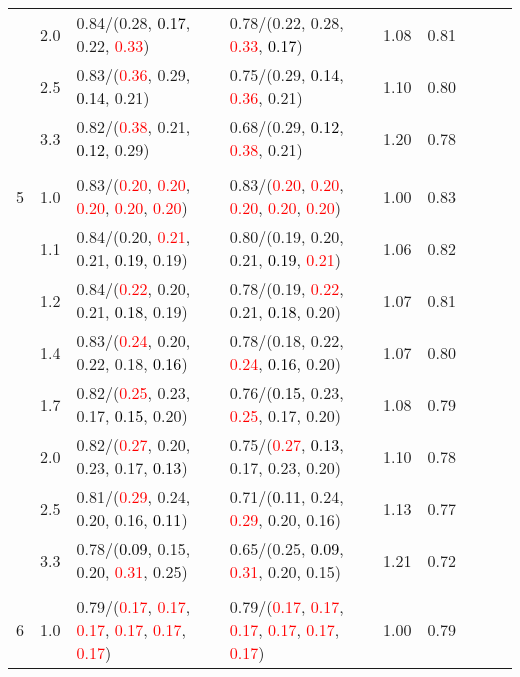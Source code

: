 \documentclass[10pt,a4paper]{report}
\begin{document}
\begin{table}[!htbp]
\begin{center}
{\begin{tabular}{ccllccccc}
			&2.0&0.84/(0.28, \textcolor{black}{0.17}, 0.22, \textcolor{red}{0.33})&0.78/(0.22, 0.28, \textcolor{red}{0.33}, \textcolor{black}{0.17})&1.08&0.81\\
			&2.5&0.83/(\textcolor{red}{0.36}, 0.29, \textcolor{black}{0.14}, 0.21)&0.75/(0.29, \textcolor{black}{0.14}, \textcolor{red}{0.36}, 0.21)&1.10&0.80\\
			&3.3&0.82/(\textcolor{red}{0.38}, 0.21, \textcolor{black}{0.12}, 0.29)&0.68/(0.29, \textcolor{black}{0.12}, \textcolor{red}{0.38}, 0.21)&1.20&0.78\\
			&&&&\\
			5			&1.0&0.83/(\textcolor{red}{0.20}, \textcolor{red}{0.20}, \textcolor{red}{0.20}, \textcolor{red}{0.20}, \textcolor{red}{0.20})&0.83/(\textcolor{red}{0.20}, \textcolor{red}{0.20}, \textcolor{red}{0.20}, \textcolor{red}{0.20}, \textcolor{red}{0.20})&1.00&0.83\\
			&1.1&0.84/(0.20, \textcolor{red}{0.21}, 0.21, \textcolor{black}{0.19}, 0.19)&0.80/(0.19, 0.20, 0.21, \textcolor{black}{0.19}, \textcolor{red}{0.21})&1.06&0.82\\
			&1.2&0.84/(\textcolor{red}{0.22}, 0.20, 0.21, \textcolor{black}{0.18}, 0.19)&0.78/(0.19, \textcolor{red}{0.22}, 0.21, \textcolor{black}{0.18}, 0.20)&1.07&0.81\\
			&1.4&0.83/(\textcolor{red}{0.24}, 0.20, 0.22, 0.18, \textcolor{black}{0.16})&0.78/(0.18, 0.22, \textcolor{red}{0.24}, \textcolor{black}{0.16}, 0.20)&1.07&0.80\\
			&1.7&0.82/(\textcolor{red}{0.25}, 0.23, 0.17, \textcolor{black}{0.15}, 0.20)&0.76/(\textcolor{black}{0.15}, 0.23, \textcolor{red}{0.25}, 0.17, 0.20)&1.08&0.79\\
			&2.0&0.82/(\textcolor{red}{0.27}, 0.20, 0.23, 0.17, \textcolor{black}{0.13})&0.75/(\textcolor{red}{0.27}, \textcolor{black}{0.13}, 0.17, 0.23, 0.20)&1.10&0.78\\
			&2.5&0.81/(\textcolor{red}{0.29}, 0.24, 0.20, 0.16, \textcolor{black}{0.11})&0.71/(\textcolor{black}{0.11}, 0.24, \textcolor{red}{0.29}, 0.20, 0.16)&1.13&0.77\\
			&3.3&0.78/(\textcolor{black}{0.09}, 0.15, 0.20, \textcolor{red}{0.31}, 0.25)&0.65/(0.25, \textcolor{black}{0.09}, \textcolor{red}{0.31}, 0.20, 0.15)&1.21&0.72\\
			&&&&\\
			6			&1.0&0.79/(\textcolor{red}{0.17}, \textcolor{red}{0.17}, \textcolor{red}{0.17}, \textcolor{red}{0.17}, \textcolor{red}{0.17}, \textcolor{red}{0.17})&0.79/(\textcolor{red}{0.17}, \textcolor{red}{0.17}, \textcolor{red}{0.17}, \textcolor{red}{0.17}, \textcolor{red}{0.17}, \textcolor{red}{0.17})&1.00&0.79\\

\end{tabular}}
\end{center}
\end{table}
\end{document}
